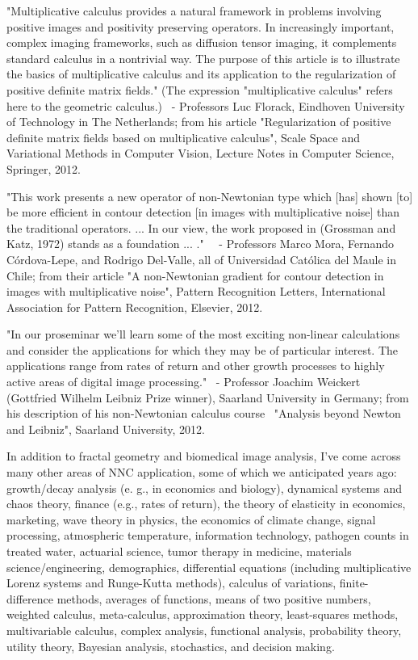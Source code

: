 \documentclass[12pt]{article}
\begin{document}
"Multiplicative calculus provides a natural framework in problems involving positive images and positivity preserving operators. In increasingly important, complex imaging frameworks, such as diffusion tensor imaging, it complements standard calculus in a nontrivial way. The purpose of this article is to illustrate the basics of multiplicative calculus and its application to the regularization of positive definite matrix fields." (The expression "multiplicative calculus" refers here to the geometric calculus.)
 - Professors Luc Florack, Eindhoven University of Technology in The Netherlands; from his article "Regularization of positive definite matrix fields based on multiplicative calculus", Scale Space and Variational Methods in Computer Vision, Lecture Notes in Computer Science, Springer, 2012.

"This work presents a new operator of non-Newtonian type which [has] shown [to] be more efficient in contour detection [in images with multiplicative noise] than the traditional operators. ... In our view, the work proposed in (Grossman and Katz, 1972) stands as a foundation ... ."  
 - Professors Marco Mora, Fernando Córdova-Lepe, and Rodrigo Del-Valle, all of Universidad Católica del Maule in Chile; from their article "A non-Newtonian gradient for contour detection in images with multiplicative noise", Pattern Recognition Letters, International Association for Pattern Recognition, Elsevier, 2012. 

"In our proseminar we'll learn some of the most exciting non-linear calculations and consider the applications for which they may be of particular interest. The applications range from rates of return and other growth processes to highly active areas of digital image processing."
 - Professor Joachim Weickert (Gottfried Wilhelm Leibniz Prize winner), Saarland University in Germany; from his description of his non-Newtonian calculus course  "Analysis beyond Newton and Leibniz", Saarland University, 2012. 

In addition to fractal geometry and biomedical image analysis, I've come across many other areas of NNC application, some of which we anticipated years ago: 
growth/decay analysis (e. g., in economics and biology), dynamical systems and chaos theory, finance (e.g., rates of return), the theory of elasticity in economics, marketing, wave theory in physics, the economics of climate change, signal processing, atmospheric temperature, information technology, pathogen counts in treated water, actuarial science, tumor therapy in medicine, materials science/engineering, demographics, differential equations (including multiplicative Lorenz systems and Runge-Kutta methods), calculus of variations, finite-difference methods, averages of functions, means of two positive numbers, weighted calculus, meta-calculus, approximation theory, least-squares methods, multivariable calculus, complex analysis, functional analysis, probability theory, utility theory, Bayesian analysis, stochastics, and decision making.
\end{document}
